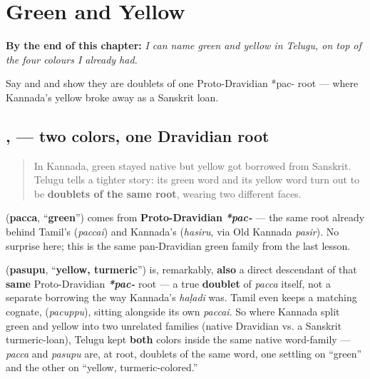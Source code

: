 
\chapter{Green and Yellow}
\label{ch:te-green-and-yellow}

\begin{chapteropening}
\textbf{By the end of this chapter:} \emph{I can name green and yellow in Telugu, on top of the four colours I already had.}

Say  and  and show they are doublets of one Proto-Dravidian *pac- root — where Kannada's yellow broke away as a Sanskrit loan.
\end{chapteropening}

\section[\texorpdfstring{\te{పచ్చ}, \te{పసుపు} (pacca pasupu)}{పచ్చ, పసుపు (pacca pasupu)}]{,  — two colors, one Dravidian root}

\label{lesson:TE-C22-pacha-pasupu}



\begin{quote}
In Kannada, green stayed native but yellow got borrowed from Sanskrit. Telugu tells a tighter story: its green word and its yellow word turn out to be \textbf{doublets of the same root}, wearing two different faces.
\end{quote}

\begin{cousinweb}
\textbf{} (\textbf{pacca}, \textquotedblleft{}\textbf{green}\textquotedblright{}) comes from \textbf{Proto-Dravidian} \emph{\textbf{*pac-}} — the same root already behind Tamil's \textbf{} (\emph{paccai}) and Kannada's \textbf{} (\emph{hasiru}, via Old Kannada \emph{pasir}). No surprise here; this is the same pan-Dravidian green family from the last lesson.
\end{cousinweb}

\begin{cousinweb}
\textbf{} (\textbf{pasupu}, \textquotedblleft{}\textbf{yellow, turmeric}\textquotedblright{}) is, remarkably, \textbf{also} a direct descendant of that \textbf{same} Proto-Dravidian \emph{\textbf{*pac-}} root — a true \textbf{doublet} of \emph{pacca} itself, not a separate borrowing the way Kannada's \emph{haḷadi} was. Tamil even keeps a matching cognate, \textbf{} (\emph{pacuppu}), sitting alongside its own \emph{paccai}. So where Kannada split green and yellow into two unrelated families (native Dravidian vs. a Sanskrit turmeric-loan), Telugu kept \textbf{both} colors inside the same native word-family — \emph{pacca} and \emph{pasupu} are, at root, doublets of the same word, one settling on \textquotedblleft{}green\textquotedblright{} and the other on \textquotedblleft{}yellow, turmeric-colored.\textquotedblright{}
\end{cousinweb}

